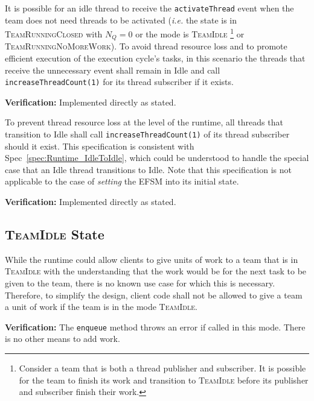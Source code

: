\documentclass{article}
\newcommand{\TeamIdle}          {\textsc{TeamIdle}}
\newcommand{\TeamRunningClosed} {\textsc{TeamRunningClosed}}
\newcommand{\TeamRunningNoMoreWork} {\textsc{TeamRunningNoMoreWork}}
\begin{document}
\begin{spec}
\label{spec:Runtime_IdleToIdle}
It is possible for an idle thread to receive the \texttt{activateThread} event
when the team does not need threads to be activated (\textit{i.e.} the state is
in {\TeamRunningClosed} with $N_Q = 0$ or the mode is \TeamIdle
\footnote{Consider a team that is both a thread publisher and subscriber.  It is
possible for the team to finish its work and transition to {\TeamIdle} before
its publisher and subscriber finish their work.} or \TeamRunningNoMoreWork).  To
avoid thread resource loss and to promote efficient execution of the execution
cycle's tasks, in this scenario the threads that receive the unnecessary event
shall remain in Idle and call \texttt{increaseThreadCount(1)} for its thread
subscriber if it exists.
\end{spec}
\textbf{Verification:}\hspace{0.125in} Implemented directly as stated.

\begin{spec}
To prevent thread resource loss at the level of the runtime, all threads that
transition to Idle shall call \texttt{increaseThreadCount(1)} of its thread
subscriber should it exist.  This specification is consistent with
Spec~\ref{spec:Runtime_IdleToIdle}, which could be understood to handle the
special case that an Idle thread transitions to Idle.  Note that this
specification is not applicable to the case of \textit{setting} the EFSM into
its initial state.
\end{spec}
\textbf{Verification:}\hspace{0.125in} Implemented directly as stated.

\subsection{{\TeamIdle} State}
\begin{spec}
\label{spec:Idle_NoEnqueue}
While the runtime could allow clients to give units of work to a team that is in
{\TeamIdle} with the understanding that the work would be for the next task to
be given to the team, there is no known use case for which this is necessary.
Therefore, to simplify the design, client code shall not be allowed to give a
team a unit of work if the team is in the mode \TeamIdle.  
\end{spec}
\textbf{Verification:}\hspace{0.125in}  The \texttt{enqueue} method throws an
error if called in this mode.  There is no other means to add work.\\
\end{document}
